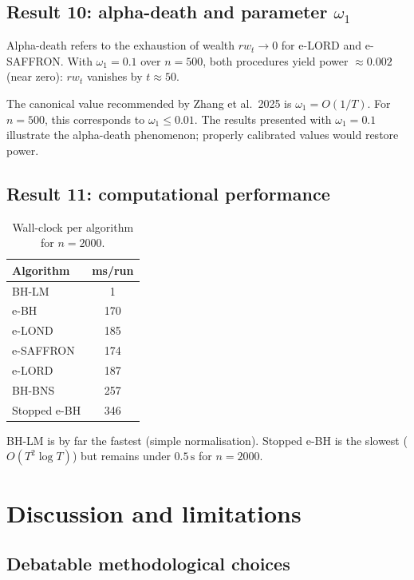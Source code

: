 \documentclass[11pt,a4paper]{article}
\theoremstyle{plain}
\theoremstyle{definition}
\theoremstyle{remark}
\begin{document}
\subsection{Result 10: alpha-death and parameter $\omega_1$}

Alpha-death refers to the exhaustion of wealth $rw_t \to 0$ for e-LORD and
e-SAFFRON. With $\omega_1 = 0.1$ over $n = 500$, both procedures yield
power $\approx 0.002$ (near zero): $rw_t$ vanishes by $t \approx 50$.

The canonical value recommended by Zhang et al.\ 2025 is $\omega_1 = O(1/T)$.
For $n = 500$, this corresponds to $\omega_1 \leq 0.01$. The results
presented with $\omega_1 = 0.1$ illustrate the alpha-death phenomenon;
properly calibrated values would restore power.

\subsection{Result 11: computational performance}

\begin{table}[H]
\centering
\caption{Wall-clock per algorithm for $n = 2000$.}
\label{tab:wallclock}
\begin{tabular}{lc}
\toprule
Algorithm & ms/run \\
\midrule
BH-LM & 1 \\
e-BH & 170 \\
e-LOND & 185 \\
e-SAFFRON & 174 \\
e-LORD & 187 \\
BH-BNS & 257 \\
Stopped e-BH & 346 \\
\bottomrule
\end{tabular}
\end{table}

BH-LM is by far the fastest (simple normalisation). Stopped e-BH is the
slowest ($O(T^2 \log T)$) but remains under $0.5\,\mathrm{s}$ for $n = 2000$.


\section{Discussion and limitations}
\label{sec:discussion}


\subsection{Debatable methodological choices}
\end{document}

